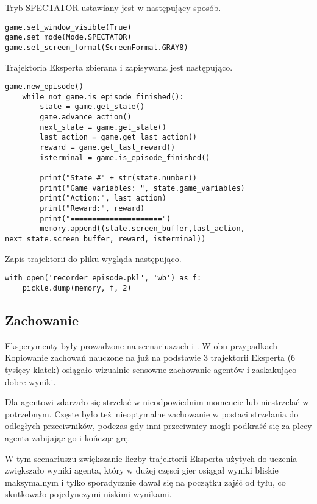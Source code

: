 \vspace{5mm}

Tryb SPECTATOR ustawiany jest w następujący sposób.
\begin{lstlisting}[language=iPython]
game.set_window_visible(True)
game.set_mode(Mode.SPECTATOR)
game.set_screen_format(ScreenFormat.GRAY8)
\end{lstlisting}

Trajektoria Eksperta zbierana i zapisywana jest następująco.

\begin{lstlisting}[language=iPython]
    game.new_episode()
    while not game.is_episode_finished():
        state = game.get_state()
        game.advance_action()
        next_state = game.get_state()
        last_action = game.get_last_action()
        reward = game.get_last_reward()
        isterminal = game.is_episode_finished()

        print("State #" + str(state.number))
        print("Game variables: ", state.game_variables)
        print("Action:", last_action)
        print("Reward:", reward)
        print("=====================")
        memory.append((state.screen_buffer,last_action, next_state.screen_buffer, reward, isterminal))
\end{lstlisting}

Zapis trajektorii do pliku wygląda następująco.

\begin{lstlisting}[language=iPython]
with open('recorder_episode.pkl', 'wb') as f:
    pickle.dump(memory, f, 2)
\end{lstlisting}

\subsection{Zachowanie}
Eksperymenty były prowadzone na scenariuszach  i .
W obu przypadkach Kopiowanie zachowań nauczone na już na podstawie 3 trajektorii Eksperta (6 tysięcy klatek) osiągało wizualnie sensowne zachowanie agentów i zaskakująco dobre wyniki.

Dla  agentowi zdarzało się strzelać w nieodpowiednim momencie lub niestrzelać w potrzebnym. Częste było też nieoptymalne zachowanie w postaci strzelania do odległych przeciwników, podczas gdy inni przeciwnicy mogli podkraść się za plecy agenta zabijając go i kończąc grę.

W tym scenariuszu zwiększanie liczby trajektorii Eksperta użytych do uczenia zwiększało wyniki agenta, który w dużej częsci gier osiągał wyniki bliskie maksymalnym i tylko sporadycznie dawał się na początku zajść od tyłu, co skutkowało pojedynczymi niskimi wynikami.

